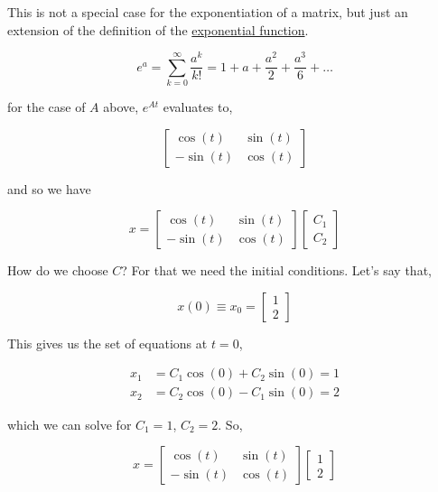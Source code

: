 \documentclass{article}
\begin{document}
\noindent This is not a special case for the exponentiation of a matrix, but just an extension of the definition of the \href{https://en.wikipedia.org/wiki/Exponential_function#Formal_definition}{exponential function}.

\begin{equation}
    e^a = \sum_{k=0}^{\infty} \frac{a^k}{k!} = 1 + a + \frac{a^2}{2} + \frac{a^3}{6} + \ldots{}
\end{equation}

\noindent for the case of $A$ above, $e^{At}$ evaluates to,

\begin{equation}
    \begin{bmatrix}
        \cos(t) & \sin(t) \\
        -\sin(t) & \cos(t)
    \end{bmatrix}
\end{equation}

\noindent and so we have

\begin{equation}
    x = \begin{bmatrix}
        \cos(t) & \sin(t) \\
        -\sin(t) & \cos(t)
    \end{bmatrix}
    \begin{bmatrix}
        C_1 \\
        C_2
    \end{bmatrix}
\end{equation}

\noindent How do we choose $C$? For that we need the initial conditions. Let's say that,

\begin{equation}
x(0) \equiv x_0 =
    \begin{bmatrix}
        1 \\
        2
    \end{bmatrix}
\end{equation}

\noindent This gives us the set of equations at $t = 0$,

\begin{align}
    x_1 &= C_1 \cos(0) + C_2 \sin(0) = 1 \\
    x_2 &= C_2 \cos(0) - C_1 \sin(0) = 2
\end{align}

\noindent which we can solve for $C_1 = 1$, $C_2 = 2$. So,

\begin{equation}
    x = \begin{bmatrix}
        \cos(t) & \sin(t) \\
        -\sin(t) & \cos(t)
    \end{bmatrix}
    \begin{bmatrix}
        1 \\
        2
    \end{bmatrix}
\end{equation}
\end{document}
